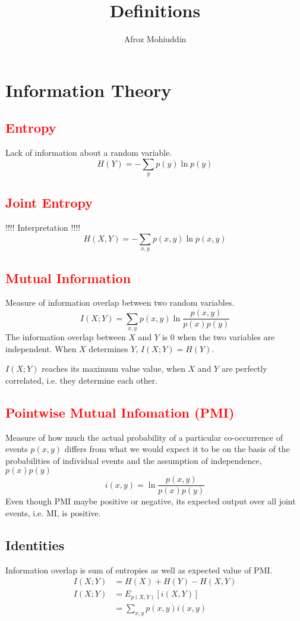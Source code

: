 \documentclass[a4paper,12pt]{article}
\title{Definitions}
\author{Afroz Mohiuddin}
\newcommand{\afrodefine}[4]{
\subsection{\textcolor{red}{#1}}
#2
$$ \ensuremath{#3} $$
#4
}
\begin{document}
\maketitle

\tableofcontents

\section{Information Theory}

\afrodefine{Entropy}{Lack of information about a random variable.}{H(Y) = -\sum_{y}p(y)\ln{p(y)}}{}

\afrodefine{Joint Entropy}{ !!!! Interpretation !!!! }{H(X, Y) = -\sum_{x, y}p(x, y)\ln{p(x, y)}}{}

\afrodefine{Mutual Information}{Measure of information overlap between two random variables.}{I(X; Y) = \sum_{x, y} p(x, y)\ln{\frac{p(x, y)}{p(x)p(y)}}}{The information overlap between $X$ and $Y$ is $0$ when the two variables are independent. When $X$ determines $Y$, $I(X; Y) = H(Y)$.

$I(X; Y)$ reaches its maximum value value, when $X$ and $Y$ are perfectly correlated, i.e. they determine each other.}

\afrodefine{Pointwise Mutual Infomation (PMI)}{Measure of how much the actual probability of a particular co-occurrence of events $p(x, y)$ differs from what we would expect it to be on the basis of the probabilities of individual events and the assumption of independence, $p(x)p(y)$}{i(x, y) = \ln{\frac{p(x, y)}{p(x)p(y)}}}{Even though PMI maybe positive or negative, its expected output over all joint events, i.e. MI, is positive.}

\subsection{Identities}
Information overlap is sum of entropies as well as expected value of PMI. 
\begin{align*}
I(X; Y) & = H(X) + H(Y) - H(X, Y) \\
I(X; Y) & = E_{p(X, Y)}[i(X, Y)] \\
& = \sum_{x, y}p(x, y)i(x, y)
\end{align*}
\end{document}
